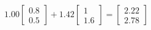 \documentclass[preview]{standalone}
\begin{document}
\begin{align*}
1.00 \begin{bmatrix} 0.8 \\ 0.5 \end{bmatrix} + 1.42 \begin{bmatrix} 1 \\ 1.6 \end{bmatrix} = \begin{bmatrix} 2.22 \\ 2.78 \end{bmatrix}
\end{align*}
\end{document}
